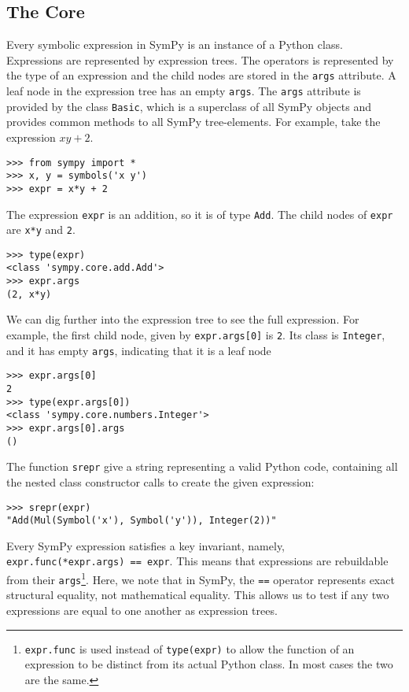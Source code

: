 

\subsection{The Core}

Every symbolic expression in SymPy is an instance of a Python class.
Expressions are represented by expression trees. The operators is represented
by the type of an expression and the child nodes are stored in the
\texttt{args} attribute. A leaf node in the expression tree has an empty
\texttt{args}.
The \texttt{args} attribute is provided by the class \texttt{Basic},
which is a superclass of all SymPy objects and
provides common methods to all SymPy tree-elements.
For example, take the expression $xy + 2$.

\begin{verbatim}
>>> from sympy import *
>>> x, y = symbols('x y')
>>> expr = x*y + 2
\end{verbatim}

The expression \texttt{expr} is an addition, so it is of type \texttt{Add}. The child
nodes of \texttt{expr} are \texttt{x*y} and \texttt{2}.

\begin{verbatim}
>>> type(expr)
<class 'sympy.core.add.Add'>
>>> expr.args
(2, x*y)
\end{verbatim}

We can dig further into the expression tree to see the full expression. For
example, the first child node, given by \texttt{expr.args[0]} is
\texttt{2}. Its class is \texttt{Integer}, and it has empty \texttt{args},
indicating that it is a leaf node

\begin{verbatim}
>>> expr.args[0]
2
>>> type(expr.args[0])
<class 'sympy.core.numbers.Integer'>
>>> expr.args[0].args
()
\end{verbatim}

The function \texttt{srepr} give a string representing a valid Python code,
containing all the nested class constructor calls to create the given expression:

\begin{verbatim}
>>> srepr(expr)
"Add(Mul(Symbol('x'), Symbol('y')), Integer(2))"
\end{verbatim}

Every SymPy expression satisfies a key invariant, namely,
\texttt{expr.func(*expr.args) == expr}. This means that expressions are
rebuildable from their \texttt{args}\footnote{\texttt{expr.func} is used
  instead of \texttt{type(expr)} to allow the function of an expression to be
  distinct from its actual Python class. In most cases the two are the same.}.
Here, we note that in SymPy, the \texttt{==} operator represents exact
structural equality, not mathematical equality. This allows us to test if any
two expressions are equal to one another as expression trees.

